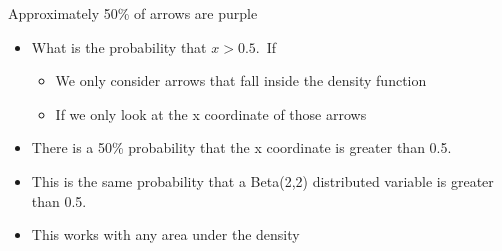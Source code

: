 \documentclass
[handout]
{beamer}
\begin{document}
\begin{frame}{Approximately 50\% of arrows are purple}
\begin{itemize}
\item What is the probability that $x>0.5$.\pause ~If
\pause
\begin{itemize}
\item We only consider arrows that fall inside the density function
\item If we only look at the x coordinate of those arrows
\end{itemize}
\pause
\item There is a 50\% probability that the x coordinate is greater than 0.5.
\pause
\item This is the same probability that a Beta(2,2) distributed variable is greater than 0.5. 
\pause
\item This works with any area under the density
\end{itemize}
\end{frame}
\end{document}

